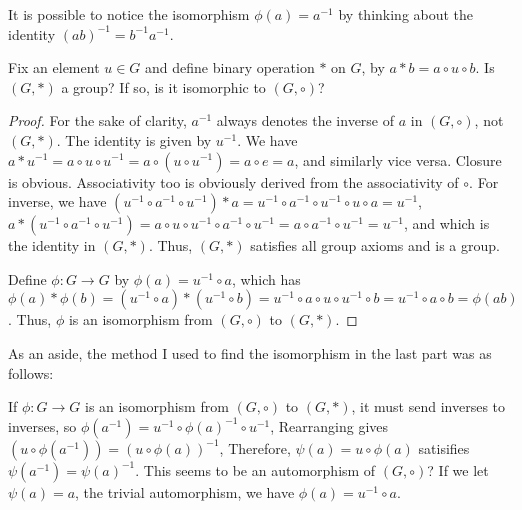 \documentclass[12pt]{article}
\begin{document}
It is possible to notice the isomorphism $\phi(a) = a^{-1}$
by thinking about the identity $(ab)^{-1} = b^{-1}a^{-1}$.

\begin{subquestion}
    Fix an element $u \in G$ and define binary operation $*$ on $G$,
    by $a * b = a \circ u \circ b$. Is $(G,*)$ a group? If so, is it isomorphic to $(G,\circ)$?
\end{subquestion}

\begin{proof}
    For the sake of clarity, $a^{-1}$ always denotes the inverse of $a$ in $(G,\circ)$, not $(G,*)$.
    The identity is given by $u^{-1}$.
    We have $a * u^{-1} = a \circ u \circ u^{-1} = a \circ (u \circ u^{-1}) = a \circ e = a$,
    and similarly vice versa. Closure is obvious.
    Associativity too is obviously derived from the associativity of $\circ$.
    For inverse, we have
    $(u^{-1} \circ a^{-1} \circ u^{-1}) * a = u^{-1} \circ a^{-1} \circ u^{-1} \circ u \circ a = u^{-1}$,
    $a * (u^{-1} \circ a^{-1} \circ u^{-1}) = a \circ u \circ u^{-1} \circ a^{-1} \circ u^{-1} = a \circ a^{-1} \circ u^{-1} = u^{-1}$, and
    which is the identity in $(G,*)$. Thus, $(G,*)$ satisfies all group axioms and is a group.

    Define $\phi : G \to G$ by $\phi(a) = u^{-1} \circ a$, which has
    $\phi(a)*\phi(b) = (u^{-1}\circ a) * (u^{-1} \circ b)
    = u^{-1} \circ a \circ u \circ u^{-1} \circ b = u^{-1} \circ a \circ b = \phi(ab) $.
    Thus, $\phi$ is an isomorphism from $(G,\circ)$ to $(G,*)$.
\end{proof}

As an aside, the method I used to find the isomorphism in the last part 
was as follows:

If $\phi : G \to G$ is an isomorphism from $(G,\circ)$ to $(G,*)$, 
it must send inverses to inverses, so $\phi(a^{-1}) = u^{-1} \circ \phi(a)^{-1} \circ u^{-1}$,
Rearranging gives $(u \circ \phi(a^{-1})) = (u \circ \phi(a))^{-1}$,
Therefore, $\psi(a) = u \circ \phi(a)$ satisifies $\psi(a^{-1}) = \psi(a)^{-1}$.
This seems to be an automorphism of $(G,\circ)$?
If we let $\psi(a) = a$, the trivial automorphism,
we have $\phi(a) = u^{-1} \circ a$.
\end{document}
